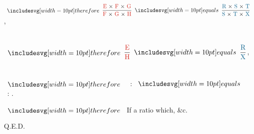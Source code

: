 \documentclass[12pt,preview]{standalone}
\begin{document}
\begin{minipage}{\textwidth}
    \begin{center}
        $\btherefore \dfrac{\text{\redE\ × \redF\ × \redG}}{\text{\redF\ × \redG\ × \redH}} \bequals \dfrac{\text{\blueR\ × \blueS\ × \blueT}}{\text{\blueS\ × \blueT\ × \blueX}}$,\\
        \hfill\\
        \hfill\\
        $\btherefore \dfrac{\text{\redE}}{\text{\redH}} \bequals \dfrac{\text{\blueR}}{\text{\blueX}}$,\\
        \hfill\\
        \hfill\\
        $\btherefore$ \redE\ : \redH $\bequals$ \blueR\ : \blueX.
    \end{center}

    \hfill

    $\btherefore$ If a ratio which, \&c.

    \hfill

    \hfill Q.E.D.
\end{minipage}
\end{document}
